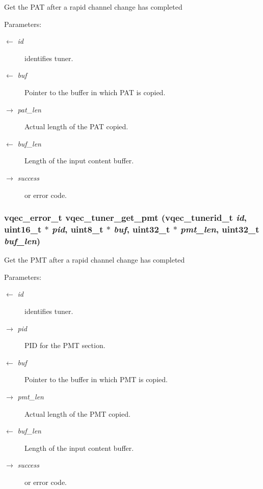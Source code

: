 Get the PAT after a rapid channel change has completed\begin{Desc}
\item[Parameters:]
\begin{description}
\item[\mbox{$\leftarrow$} {\em id}]identifies tuner. \item[\mbox{$\leftarrow$} {\em buf}]Pointer to the buffer in which PAT is copied. \item[\mbox{$\rightarrow$} {\em pat\_\-len}]Actual length of the PAT copied. \item[\mbox{$\leftarrow$} {\em buf\_\-len}]Length of the input content buffer. \item[\mbox{$\rightarrow$} {\em success}]or error code. \end{description}
\end{Desc}
\subsubsection{\setlength{\rightskip}{0pt plus 5cm}vqec\_\-error\_\-t vqec\_\-tuner\_\-get\_\-pmt (vqec\_\-tunerid\_\-t {\em id}, uint16\_\-t $\ast$ {\em pid}, uint8\_\-t $\ast$ {\em buf}, uint32\_\-t $\ast$ {\em pmt\_\-len}, uint32\_\-t {\em buf\_\-len})}\label{vqec__tuner_8h_de8175e809be82b1c14fa03b171e8ae9}


Get the PMT after a rapid channel change has completed\begin{Desc}
\item[Parameters:]
\begin{description}
\item[\mbox{$\leftarrow$} {\em id}]identifies tuner. \item[\mbox{$\rightarrow$} {\em pid}]PID for the PMT section. \item[\mbox{$\leftarrow$} {\em buf}]Pointer to the buffer in which PMT is copied. \item[\mbox{$\rightarrow$} {\em pmt\_\-len}]Actual length of the PMT copied. \item[\mbox{$\leftarrow$} {\em buf\_\-len}]Length of the input content buffer. \item[\mbox{$\rightarrow$} {\em success}]or error code. \end{description}
\end{Desc}
